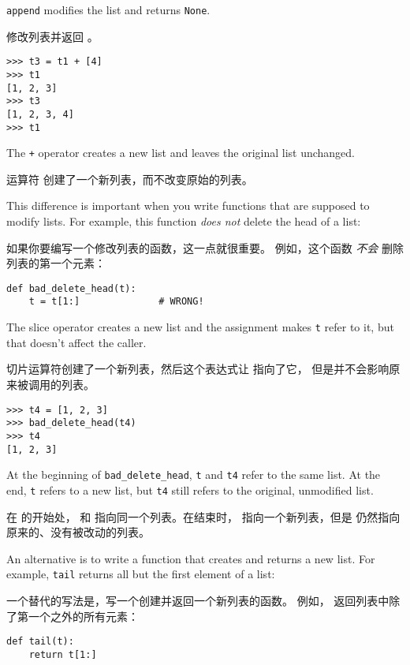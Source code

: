 %
{\tt append} modifies the list and returns {\tt None}.

 修改列表并返回 。

%
\begin{lstlisting}
>>> t3 = t1 + [4]
>>> t1
[1, 2, 3]
>>> t3
[1, 2, 3, 4]
>>> t1
\end{lstlisting}

%
The {\tt +} operator creates a new list and leaves the
original list unchanged.

运算符 \li{+} 创建了一个新列表，而不改变原始的列表。

This difference is important when you write functions that
are supposed to modify lists.  For example, this function
{\em does not} delete the head of a list:

如果你要编写一个修改列表的函数，这一点就很重要。
例如，这个函数 {\em 不会} 删除列表的第一个元素：

%
\begin{lstlisting}
def bad_delete_head(t):
    t = t[1:]              # WRONG!
\end{lstlisting}

%
The slice operator creates a new list and the assignment
makes {\tt t} refer to it, but that doesn't affect the caller.

切片运算符创建了一个新列表，然后这个表达式让  指向了它，
但是并不会影响原来被调用的列表。

  

%
\begin{lstlisting}
>>> t4 = [1, 2, 3]
>>> bad_delete_head(t4)
>>> t4
[1, 2, 3]
\end{lstlisting}

%
At the beginning of \verb"bad_delete_head", {\tt t} and {\tt t4}
refer to the same list.  At the end, {\tt t} refers to a new list,
but {\tt t4} still refers to the original, unmodified list.

在  的开始处， 和  指向同一个列表。在结束时， 指向一个新列表，但是  仍然指向原来的、没有被改动的列表。

An alternative is to write a function that creates and
returns a new list.  For example, {\tt tail} returns all but the first
element of a list:

一个替代的写法是，写一个创建并返回一个新列表的函数。
例如， 返回列表中除了第一个之外的所有元素：

\begin{lstlisting}
def tail(t):
    return t[1:]
\end{lstlisting}

